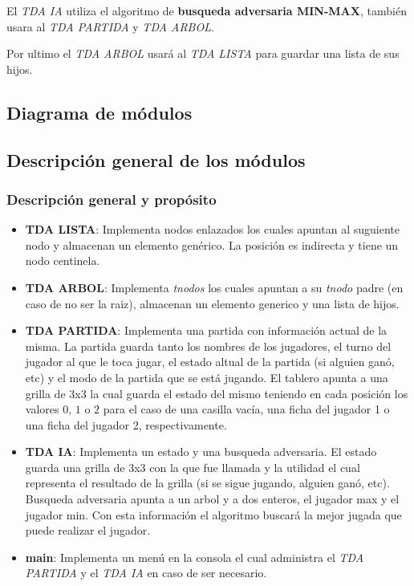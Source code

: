 \documentclass[12pt,twocolum,a4paper]{article}
\begin{document}
    El {\itshape TDA IA} utiliza el algoritmo de {\bf busqueda adversaria MIN-MAX}, tambi\'en usara al {\itshape TDA PARTIDA} y {\itshape TDA ARBOL}.

    Por ultimo el {\itshape TDA ARBOL} usar\'a al {\itshape TDA LISTA} para guardar una lista de sus hijos.

\subsection{Diagrama de m\'odulos}

\subsection{Descripci\'on general de los m\'odulos}
\subsubsection{Descripci\'on general y prop\'osito}
\begin{itemize}
    \item {\bf TDA LISTA}: Implementa nodos enlazados los cuales apuntan al suguiente nodo y almacenan un elemento gen\'erico. La posici\'on es indirecta y tiene un nodo centinela.
	\item {\bf TDA ARBOL}: Implementa \emph{tnodos} los cuales apuntan a su \emph{tnodo} padre (en caso de no ser la raiz), almacenan un elemento generico y una lista de hijos.
    \item {\bf TDA PARTIDA}: Implementa una partida con informaci\'on actual de la misma. La partida guarda tanto los nombres de los jugadores, el turno del jugador al que le toca jugar, el estado altual de la partida (si alguien gan\'o, etc) y el modo de la partida que se est\'a jugando. El tablero apunta a una grilla de 3x3 la cual guarda el estado del mismo teniendo en cada posici\'on los valores $0$, $1$ o $2$ para el caso de una casilla vac\'ia, una ficha del jugador 1 o una ficha del jugador 2, respectivamente.
    \item {\bf TDA IA}: Implementa un estado y una busqueda adversaria. El estado guarda una grilla de 3x3 con la que fue llamada y la utilidad el cual representa el resultado de la grilla (si se sigue jugando, alguien gan\'o, etc). Busqueda adversaria apunta a un arbol y a dos enteros, el jugador max y el jugador min. Con esta informaci\'on el algoritmo buscar\'a la mejor jugada que puede realizar el jugador.
    \item {\bf main}: Implementa un men\'u en la consola el cual administra el {\itshape TDA PARTIDA} y el {\itshape TDA IA} en caso de ser necesario.
\end{itemize}
\end{document}
